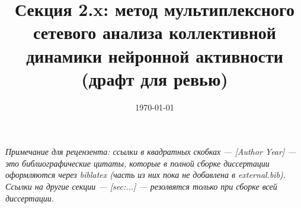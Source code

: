 \documentclass[12pt,a4paper]{article}
\title{Секция 2.x: метод мультиплексного сетевого анализа коллективной\\
       динамики нейронной активности \\ \large (драфт для ревью)}
\author{}
\date{\today}
\begin{document}
\maketitle

\noindent\textit{Примечание для рецензента: ссылки в квадратных скобках —
\textcolor{blue!60!black}{[Author Year]} — это библиографические цитаты, которые в полной сборке диссертации
оформляются через biblatex (часть из них пока не добавлена в external.bib).
Ссылки на другие секции — \textcolor{red!70!black}{[\textit{sec:...}]} — резолвятся только при сборке всей диссертации.}

\vspace{1em}


\end{document}
